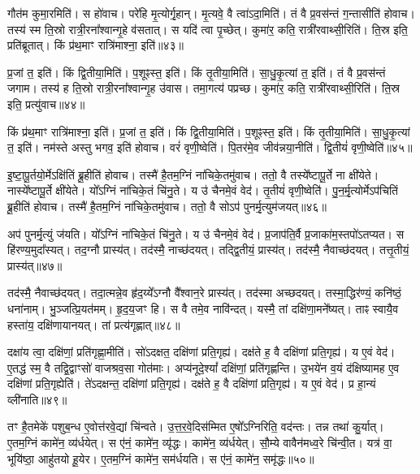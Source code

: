    गौत॑म कुमा॒रमिति॑।
   स हो॑वाच।
   परे॑हि मृ॒त्योर्गृ॒हान्।
   मृ॒त्यवे॒ वै त्वा॑ऽदा॒मिति॑।
   तं वै प्र॒वस॑न्तं ग॒न्तासीति॑ होवाच।
   तस्य॑ स्म ति॒स्रो रात्री॒रना᳚श्वान्गृ॒हे व॑सतात्।
   स यदि॑ त्वा पृ॒च्छेत्।
   कुमा॑र॒ कति॒ रात्री॑रवाथ्सी॒रिति॑।
   ति॒स्र इति॒ प्रति॑ब्रूतात्।
   किं प्र॑थ॒माꣳ रात्रि॑माश्ना॒ इति॑॥४३॥

   प्र॒जां त॒ इति॑।
   किं द्वि॒तीया॒मिति॑।
   प॒शूꣴस्त॒ इति॑।
   किं तृ॒तीया॒मिति॑।
   सा॒धु॒कृ॒त्यां त॒ इति॑।
   तं वै प्र॒वस॑न्तं जगाम।
   तस्य॑ ह ति॒स्रो रात्री॒रना᳚श्वान्गृ॒ह उ॑वास।
   तमा॒गत्य॑ पप्रच्छ।
   कुमा॑र॒ कति॒ रात्री॑रवाथ्सी॒रिति॑।
   ति॒स्र इति॒ प्रत्यु॑वाच॥४४॥

   किं प्र॑थ॒माꣳ रात्रि॑माश्ना॒ इति॑।
   प्र॒जां त॒ इति॑।
   किं द्वि॒तीया॒मिति॑।
   प॒शूꣴस्त॒ इति॑।
   किं तृ॒तीया॒मिति॑।
   सा॒धु॒कृ॒त्यां त॒ इति॑।
   नम॑स्ते अस्तु भगव॒ इति॑ होवाच।
   वरं॑ वृणी॒ष्वेति॑।
   पि॒तर॑मे॒व जीव॑न्नया॒नीति॑।
   द्वि॒तीयं॑ वृणी॒ष्वेति॑॥४५॥

   इ॒ष्टा॒पू॒र्तयो॒र्मेऽक्षि॑तिं ब्रू॒हीति॑ होवाच।
   तस्मै॑ है॒तम॒ग्निं ना॑चिके॒तमु॑वाच।
   ततो॒ वै तस्ये᳚ष्टापू॒र्ते ना क्षी॑येते।
   नास्ये᳚ष्टापू॒र्ते क्षी॑येते।
   यो᳚ऽग्निं ना॑चिके॒तं चि॑नु॒ते।
   य उ॑ चैनमे॒वं वेद॑।
   तृ॒तीयं॑ वृणी॒ष्वेति॑।
   पु॒न॒र्मृ॒त्योर्मेऽप॑चितिं ब्रू॒हीति॑ होवाच।
   तस्मै॑ है॒तम॒ग्निं ना॑चिके॒तमु॑वाच।
   ततो॒ वै सोऽप॑ पुनर्मृ॒त्युम॑जयत्॥४६॥

   अप॑ पुनर्मृ॒त्युं ज॑यति।
   यो᳚ऽग्निं ना॑चिके॒तं चि॑नु॒ते।
   य उ॑ चैनमे॒वं वेद॑।
   प्र॒जाप॑ति॒र्वै प्र॒जाका॑म॒स्तपो॑ऽतप्यत।
   स हि॑रण्य॒मुदा᳚स्यत्।
   तद॒ग्नौ प्रास्य॑त्।
   तद॑स्मै॒ नाच्छ॑दयत्।
   तद्द्वि॒तीयं॒ प्रास्य॑त्।
   तद॑स्मै॒ नैवाच्छ॑दयत्।
   तत्तृ॒तीयं॒ प्रास्य॑त्॥४७॥

   तद॑स्मै॒ नैवाच्छ॑दयत्।
   तदा॒त्मन्ने॒व हृ॑द॒य्ये᳚ऽग्नौ वै᳚श्वान॒रे प्रास्य॑त्।
   तद॑स्मा अच्छदयत्।
   तस्मा॒द्धिर॑ण्यं॒ कनि॑ष्ठं॒ धना॑नाम्।
   भु॒ञ्जत्प्रि॒यत॑मम्।
   हृ॒द॒य॒जꣳ हि।
   स वै तमे॒व नावि॑न्दत्।
   यस्मै॒ तां दक्षि॑णा॒मने᳚ष्यत्।
   ताꣴ स्वायै॒व हस्ता॑य॒ दक्षि॑णायानयत्।
   तां प्रत्य॑गृह्णात्॥४८॥

   दक्षा॑य त्वा॒ दक्षि॑णां॒ प्रति॑गृह्णा॒मीति॑।
   सो॑ऽदक्षत॒ दक्षि॑णां प्रति॒गृह्य॑।
   दक्ष॑ते ह॒ वै दक्षि॑णां प्रति॒गृह्य॑।
   य ए॒वं वेद॑।
   ए॒तद्ध॑ स्म॒ वै तद्वि॒द्वाꣳसो॑ वाजश्रव॒सा गोत॑माः।
   अप्य॑नूदे॒श्यां᳚ दक्षि॑णां॒ प्रति॑गृह्णन्ति।
   उ॒भये॑न व॒यं द॑क्षिष्यामह ए॒व दक्षि॑णां प्रति॒गृह्येति॑।
   ते॑ऽदक्षन्त॒ दक्षि॑णां प्रति॒गृह्य॑।
   दक्ष॑ते ह॒ वै दक्षि॑णां प्रति॒गृह्य॑।
   य ए॒वं वेद॑।
   प्र  हा॒न्यं व्ली॑नाति॥४९॥
   \anuvakamend
  
   तꣳ है॒तमेके॑ पशुब॒न्ध ए॒वोत्त॑रवे॒द्यां चि॑न्वते।
   उ॒त्त॒र॒वे॒दिस॑म्मित ए॒षो᳚ऽग्निरिति॒ वद॑न्तः।
   तन्न तथा॑ कु॒र्यात्।
   ए॒तम॒ग्निं कामे॑न॒ व्य॑र्धयेत्।
   स ए॑नं॒ कामे॑न॒ व्यृ॑द्धः।
   कामे॑न॒ व्य॑र्धयेत्।
   सौ॒म्ये वावैन॑मध्व॒रे चि॑न्वी॒त।
   यत्र॑ वा॒ भूयि॑ष्ठा॒ आहु॑तयो हू॒येर\sn{}।
   ए॒तम॒ग्निं कामे॑न॒ सम॑र्धयति।
   स ए॑नं॒ कामे॑न॒ समृ॑द्धः॥५०॥

